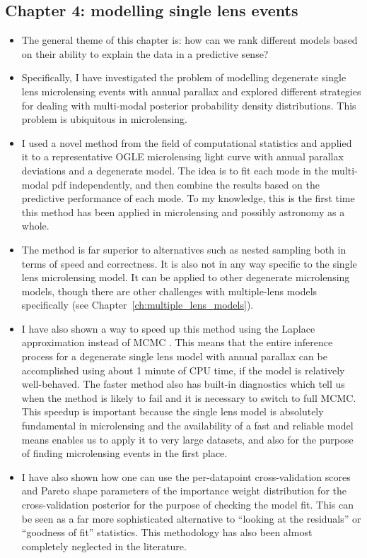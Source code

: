 \documentclass[12pt,dvipsnames]{report}
\begin{document}
\subsection{Chapter 4: modelling single lens events}
\begin{itemize}
    \item The general theme of this chapter is: how can we rank different models based on their 
    ability to explain the data in a predictive sense?
    \item Specifically, I have investigated the problem of modelling degenerate single lens microlensing 
    events with annual parallax and explored different strategies for dealing with multi-modal 
    posterior probability density distributions. This problem is ubiquitous in microlensing.
    \item I used a novel method from the field of computational statistics 
    \citep{arXiv:2006.12335} and applied it to a representative OGLE microlensing light curve with 
    annual parallax deviations and a degenerate model. The idea is to fit each mode in 
    the multi-modal pdf independently, and then combine the results based on the predictive 
    performance of each mode. To my knowledge, this is the first time this method has been applied
    in microlensing and possibly astronomy as a whole.
    \item The method is far superior to alternatives such as nested sampling both in 
    terms of speed and correctness. It is also not in any way specific to the single lens
    microlensing model. It can be applied to other degenerate microlensing models, 
    though there are other challenges with multiple-lens models specifically (see 
    Chapter~\ref{ch:multiple_lens_models}).
    \item I have also shown a way to speed up this method using the Laplace approximation
    instead of MCMC \citep[see][]{pmlr-v97-magnusson19a}. This means that the entire inference 
    process for a degenerate single lens model with annual parallax can be accomplished using about 
    1 minute of CPU time, if the model is relatively well-behaved. The faster method also 
    has built-in diagnostics which tell us when the method is likely to fail and it is necessary 
    to switch to full MCMC. This speedup is important because the single lens model is 
    absolutely fundamental in microlensing and the availability of a fast and reliable model means enables
    us to apply it to very large datasets, and also for the purpose of finding microlensing events 
    in the first place.
    \item I have also shown how one can use the per-datapoint cross-validation scores 
    and Pareto shape parameters of the importance weight distribution for the cross-validation
    posterior for the purpose of checking the model fit.
     This can be seen as a far more sophisticated alternative to 
    ``looking at the residuals'' or ``goodness of fit'' statistics. This methodology has also
    been almost completely neglected in the literature.
\end{itemize}
\end{document}
